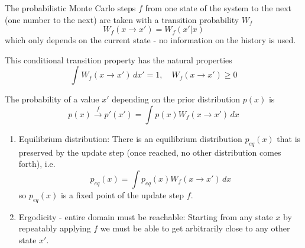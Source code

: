 The probabilistic Monte Carlo steps $f$ from one state of the system to the next (one number to the next)
are taken with a transition probability $W_f$
\begin{equation}
    W_f(x\rightarrow x') = W_f(x'|x)
\end{equation}
which \textcolor{blue1}{only depends on the current state} - no information on the history is used.

This conditional transition property has the natural properties
\begin{equation}
    \int W_f(x \rightarrow x') \, dx' = 1, \quad W_f(x \rightarrow x') \geq 0
\end{equation}

The probability of a value $x'$ depending on the prior distribution $p(x)$ is
\begin{equation}
    p(x) \overset{f}\rightarrow p'(x') = \int p(x) W_f(x\rightarrow x') \, dx
\end{equation}


\begin{enumerate}
    \item \textcolor{blue1}{Equilibrium distribution}: There is an equilibrium distribution $p_{eq}(x)$ that is
    preserved by the update step (once reached, no other distribution comes forth), i.e.
    \begin{equation}
        \label{eq:fix_point_MK}
        p_{eq}(x) = \int p_{eq}(x) W_f(x\rightarrow x') \, dx
    \end{equation}
    so $p_{eq}(x)$ is a fixed point of the update step $f$.
    \item \textcolor{blue1}{Ergodicity - entire domain must be reachable}: Starting from any state $x$ by repeatably
    applying $f$ we must be able to get arbitrarily close to any other state $x'$.
\end{enumerate}

